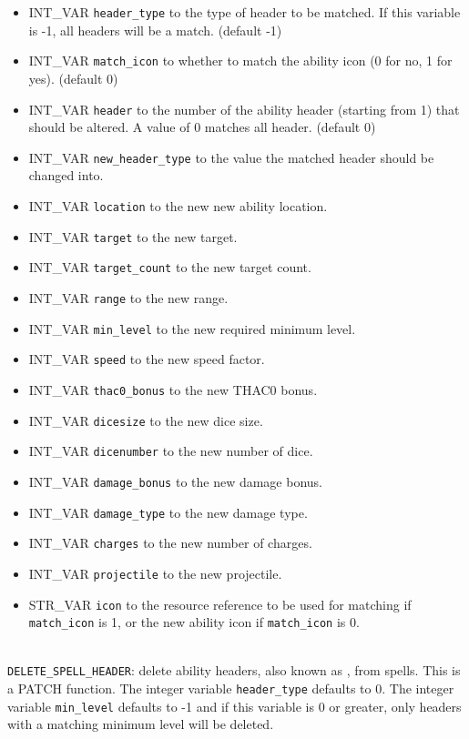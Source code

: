\documentclass{article}
\begin{document}
\begin{itemize}
\item INT_VAR \verb+header_type+ to the type of header to be matched. If this variable is -1, all headers will be a match. (default -1)
\item INT_VAR \verb+match_icon+ to whether to match the ability icon (0 for no, 1 for yes). (default 0)
\item INT_VAR \verb+header+ to the number of the ability header (starting from 1) that should be altered. A value of 0 matches all header. (default 0)
\item INT_VAR \verb+new_header_type+ to the value the matched header should be changed into.
\item INT_VAR \verb+location+ to the new new ability location.
\item INT_VAR \verb+target+ to the new target.
\item INT_VAR \verb+target_count+ to the new target count.
\item INT_VAR \verb+range+ to the new range.
\item INT_VAR \verb+min_level+ to the new required minimum level.
\item INT_VAR \verb+speed+ to the new speed factor.
\item INT_VAR \verb+thac0_bonus+ to the new THAC0 bonus.
\item INT_VAR \verb+dicesize+ to the new dice size.
\item INT_VAR \verb+dicenumber+ to the new number of dice.
\item INT_VAR \verb+damage_bonus+ to the new damage bonus.
\item INT_VAR \verb+damage_type+ to the new damage type.
\item INT_VAR \verb+charges+ to the new number of charges.
\item INT_VAR \verb+projectile+ to the new projectile.
\item STR_VAR \verb+icon+ to the resource reference to be used for matching if \verb+match_icon+ is 1, or the new ability icon if \verb+match_icon+ is 0.
\end{itemize}
\\

\verb+DELETE_SPELL_HEADER+: delete ability headers, also known as , from spells. This is a PATCH function. The integer variable \verb+header_type+ defaults to 0. The integer variable \verb+min_level+ defaults to -1 and if this variable is 0 or greater, only headers with a matching minimum level will be deleted.
\end{document}
